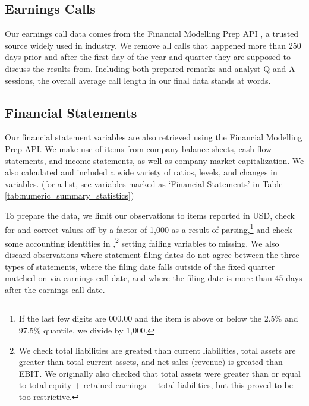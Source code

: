 \documentclass{article}[11pt]
\begin{document}
    \subsection*{Earnings Calls}

    Our earnings call data comes from the Financial Modelling Prep API \citep{financial_modeling_prep_financial_2024}, a trusted source widely used in industry. We remove all calls that happened more than 250 days prior and after the first day of the year and quarter they are supposed to discuss the results from. Including both prepared remarks and analyst Q and A sessions, the overall average call length in our final data stands at \avgCallLength \space words.

    \subsection*{Financial Statements}

    Our financial statement variables are also retrieved using the Financial Modelling Prep API. We make use of items from company balance sheets, cash flow statements, and income statements, as well as company market capitalization. We also calculated and included a wide variety of ratios, levels, and changes in variables. (for a list, see variables marked as `Financial Statements' in Table \ref{tab:numeric_summary_statistics})
    
    To prepare the data, we limit our observations to items reported in USD, check for and correct values off by a factor of 1,000 as a result of parsing,\footnote{If the last few digits are 000.00 and the item is above or below the 2.5\% and 97.5\% quantile, we divide by 1,000.} and check some accounting identities in \cite{das_credit_2023},\footnote{We check total liabilities are greated than current liabilities, total assets are greater than total current assets, and net sales (revenue) is greated than EBIT. We originally also checked that total assets were greater than or equal to total equity + retained earnings + total liabilities, but this proved to be too restrictive.} setting failing variables to missing. We also discard observations where statement filing dates do not agree between the three types of statements, where the filing date falls outside of the fixed quarter matched on via earnings call date, and where the filing date is more than 45 days after the earnings call date.
\end{document}
